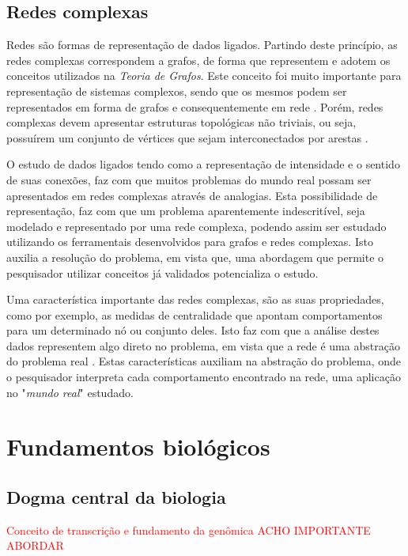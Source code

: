 \subsection{Redes complexas}
Redes são formas de representação de dados ligados. Partindo deste princípio, as redes complexas correspondem a grafos, de forma que representem e adotem os conceitos utilizados na \textsl{Teoria de Grafos}. Este conceito foi muito importante para representação de sistemas complexos, sendo que os mesmos podem ser representados em forma de grafos e consequentemente em rede \cite{Strogatz2001}. Porém, redes complexas devem apresentar estruturas topológicas não triviais, ou seja, possuírem um conjunto de vértices que sejam interconectados por arestas \cite{Barabasi2003}.
%

O estudo de dados ligados tendo como a representação de intensidade e o sentido de suas conexões, faz com que muitos problemas do mundo real possam ser apresentados em redes complexas através de analogias. Esta possibilidade de representação, faz com que um problema aparentemente indescritível, seja modelado e representado por uma rede complexa, podendo assim ser estudado utilizando os ferramentais desenvolvidos para grafos e redes complexas. Isto auxilia a resolução do problema, em vista que, uma abordagem que permite o pesquisador utilizar conceitos já validados potencializa o estudo. 
%

Uma característica importante das redes complexas, são as suas propriedades, como por exemplo, as medidas de centralidade que apontam comportamentos para um determinado nó ou conjunto deles. Isto faz com que a análise destes dados representem algo direto no problema, em vista que a rede é uma abstração do problema real \cite{Metz2007}. Estas características auxiliam na abstração do problema, onde o pesquisador interpreta cada comportamento encontrado na rede, uma aplicação no "\textsl{mundo real}" estudado.
%
	


\section{Fundamentos biológicos}

\subsection{Dogma central da biologia}

\textcolor{red}{Conceito de transcrição e fundamento da genômica ACHO IMPORTANTE ABORDAR}

